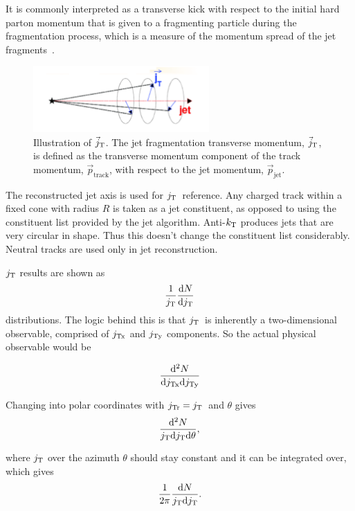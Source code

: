 It is commonly interpreted as a transverse kick with respect to the initial hard parton momentum that is given to a fragmenting particle during the fragmentation process, which is a measure of the momentum spread of the jet fragments~\cite{}. 

   \begin{figure}
    \begin{center}
      \includegraphics[width = 0.60\textwidth]{figures/jt_def}
    \end{center}
    \caption{Illustration of $\vec{j}_{\rm T}$. The jet fragmentation transverse momentum, $\vec{j}_{\rm T}$, is defined as the transverse momentum component of the track momentum, $\vec{p}_{\mathrm{track}}$, with respect to the jet momentum, $\vec{p}_{\mathrm{jet}}$.}
    \label{fig:jtdefinition}
  \end{figure}

The reconstructed jet axis is used for $j_{\rm T}$ reference. Any charged track within a fixed cone with radius $R$ is taken as a jet constituent, as opposed to using the constituent list provided by the jet algorithm. Anti-$k_{\rm T}$ produces jets that are very circular in shape. Thus this doesn't change the constituent list considerably. Neutral tracks are used only in jet reconstruction.
 
$j_{\rm T}$ results are shown as 
\begin{equation}
\frac{1}{j_{\rm T}}\frac{\mathrm{d}N}{\mathrm{d}j_{\rm T}}
\end{equation}
distributions. The logic behind this is that $j_{\rm T}$ is inherently a two-dimensional observable, comprised of $j_{\rm Tx}$ and $j_{\rm Ty}$ components. So the actual physical observable would be 
 
 \begin{equation}
 \frac{\mathrm{d}^2N}{\mathrm{d} j_{\rm Tx} \mathrm{d} j_{\rm Ty}}
 \end{equation}

 Changing into polar coordinates with $j_{\rm Tr} = j_{\rm T}$ and $\theta$ gives
 \begin{equation}
 \frac{\mathrm{d}^2N}{j_{\rm T} \mathrm{d} j_{\rm T} \mathrm{d} \theta},
 \end{equation}

where $j_{\rm T}$ over the azimuth $\theta$ should stay constant and it can be integrated over, which gives 
\begin{equation}
\frac{1}{2\pi}\frac{\mathrm{d}N}{j_{\rm T} \mathrm{d} j_{\rm T}}.
 \end{equation}

